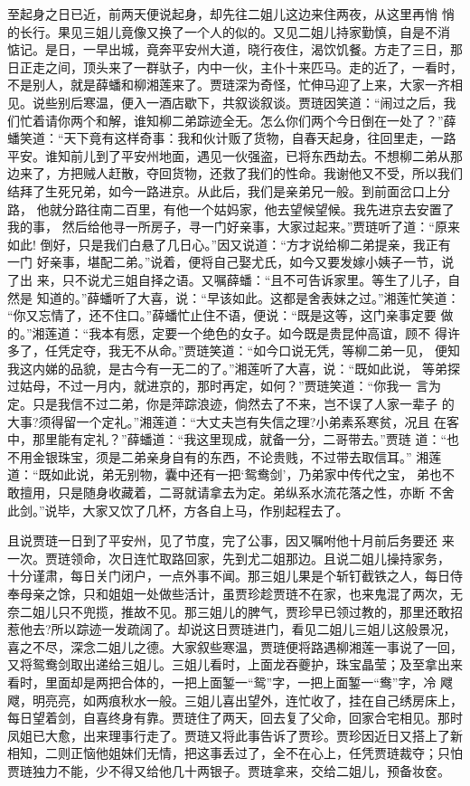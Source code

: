 至起身之日已近，前两天便说起身，却先往二姐儿这边来住两夜，从这里再悄
悄的长行。果见三姐儿竟像又换了一个人的似的。又见二姐儿持家勤慎，自是不消
惦记。是日，一早出城，竟奔平安州大道，晓行夜住，渴饮饥餐。方走了三日，那
日正走之间，顶头来了一群驮子，内中一伙，主仆十来匹马。走的近了，一看时，
不是别人，就是薛蟠和柳湘莲来了。贾琏深为奇怪，忙伸马迎了上来，大家一齐相
见。说些别后寒温，便入一酒店歇下，共叙谈叙谈。贾琏因笑道：“闹过之后，我
们忙着请你两个和解，谁知柳二弟踪迹全无。怎么你们两个今日倒在一处了？”薛
蟠笑道：“天下竟有这样奇事：我和伙计贩了货物，自春天起身，往回里走，一路
平安。谁知前儿到了平安州地面，遇见一伙强盗，已将东西劫去。不想柳二弟从那
边来了，方把贼人赶散，夺回货物，还救了我们的性命。我谢他又不受，所以我们
结拜了生死兄弟，如今一路进京。从此后，我们是亲弟兄一般。到前面岔口上分路，
他就分路往南二百里，有他一个姑妈家，他去望候望候。我先进京去安置了我的事，
然后给他寻一所房子，寻一门好亲事，大家过起来。”贾琏听了道：“原来如此!
倒好，只是我们白悬了几日心。”因又说道：“方才说给柳二弟提亲，我正有一门
好亲事，堪配二弟。”说着，便将自己娶尤氏，如今又要发嫁小姨子一节，说了出
来，只不说尤三姐自择之语。又嘱薛蟠：“且不可告诉家里。等生了儿子，自然是
知道的。”薛蟠听了大喜，说：“早该如此。这都是舍表妹之过。”湘莲忙笑道：
“你又忘情了，还不住口。”薛蟠忙止住不语，便说：“既是这等，这门亲事定要
做的。”湘莲道：“我本有愿，定要一个绝色的女子。如今既是贵昆仲高谊，顾不
得许多了，任凭定夺，我无不从命。”贾琏笑道：“如今口说无凭，等柳二弟一见，
便知我这内娣的品貌，是古今有一无二的了。”湘莲听了大喜，说：“既如此说，
等弟探过姑母，不过一月内，就进京的，那时再定，如何？”贾琏笑道：“你我一
言为定。只是我信不过二弟，你是萍踪浪迹，倘然去了不来，岂不误了人家一辈子
的大事?须得留一个定礼。”湘莲道：“大丈夫岂有失信之理?小弟素系寒贫，况且
在客中，那里能有定礼？”薛蟠道：“我这里现成，就备一分，二哥带去。”贾琏
道：“也不用金银珠宝，须是二弟亲身自有的东西，不论贵贱，不过带去取信耳。”
湘莲道：“既如此说，弟无别物，囊中还有一把‘鸳鸯剑’，乃弟家中传代之宝，
弟也不敢擅用，只是随身收藏着，二哥就请拿去为定。弟纵系水流花落之性，亦断
不舍此剑。”说毕，大家又饮了几杯，方各自上马，作别起程去了。

且说贾琏一日到了平安州，见了节度，完了公事，因又嘱咐他十月前后务要还
来一次。贾琏领命，次日连忙取路回家，先到尤二姐那边。且说二姐儿操持家务，
十分谨肃，每日关门闭户，一点外事不闻。那三姐儿果是个斩钉截铁之人，每日侍
奉母亲之馀，只和姐姐一处做些活计，虽贾珍趁贾琏不在家，也来鬼混了两次，无
奈二姐儿只不兜揽，推故不见。那三姐儿的脾气，贾珍早已领过教的，那里还敢招
惹他去?所以踪迹一发疏阔了。却说这日贾琏进门，看见二姐儿三姐儿这般景况，
喜之不尽，深念二姐儿之德。大家叙些寒温，贾琏便将路遇柳湘莲一事说了一回，
又将鸳鸯剑取出递给三姐儿。三姐儿看时，上面龙吞夔护，珠宝晶莹；及至拿出来
看时，里面却是两把合体的，一把上面錾一“鸳”字，一把上面錾一“鸯”字，冷
飕飕，明亮亮，如两痕秋水一般。三姐儿喜出望外，连忙收了，挂在自己绣房床上，
每日望着剑，自喜终身有靠。贾琏住了两天，回去复了父命，回家合宅相见。那时
凤姐已大愈，出来理事行走了。贾琏又将此事告诉了贾珍。贾珍因近日又搭上了新
相知，二则正恼他姐妹们无情，把这事丢过了，全不在心上，任凭贾琏裁夺；只怕
贾琏独力不能，少不得又给他几十两银子。贾琏拿来，交给二姐儿，预备妆奁。

